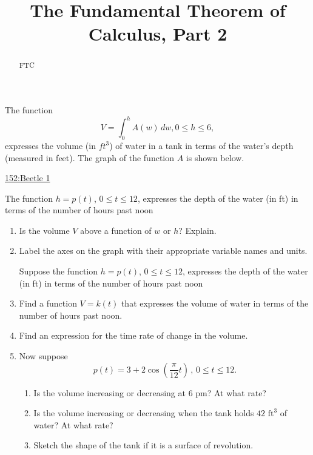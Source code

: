 \documentclass{ximera}
\title{The Fundamental Theorem of Calculus, Part 2}
\begin{document}
\begin{abstract}
FTC
\end{abstract}
\maketitle

\begin{question}\label{QWEdrf4}
The function
\[
V =\int_0^h A(w)\, dw, 0\leq h \leq 6,
\]
expresses the volume (in $ft^3$) of water in a tank in terms of the water’s depth (measured in feet). The graph of the function $A$ is shown below.


\begin{onlineOnly}
    \begin{center}
\end{center}
\end{onlineOnly}

\href{https://www.desmos.com/calculator/ae516hl7j6}{152:Beetle 1}



The function $h = p(t)$, $0 \leq t \leq 12$, expresses the depth of the water (in
ft) in terms of the number of hours past noon

\begin{enumerate}

\item Is the volume $V$ above a function of $w$ or $h$? Explain.

 \item Label the axes on the graph with their appropriate variable names and
units.



Suppose the function $h = p(t)$, $0 \leq t \leq 12$, expresses the depth of the water (in
ft) in terms of the number of hours past noon

\item Find a function $V = k(t)$ that expresses the volume of water in terms of
the number of hours past noon.

\item Find an expression for the time rate of change in the volume.

\item Now suppose
\[
p(t) = 3 + 2 \cos\left( \frac{\pi}{12}t \right) \,,\, 0 \leq t \leq 12.
\]
\begin{enumerate}
    \item Is the volume increasing or decreasing at 6 pm? At what rate?
    \item Is the volume increasing or decreasing when the tank holds $42\text{ ft}^3$ of
water? At what rate?
    \item Sketch the shape of the tank if it is a surface of revolution.

\end{enumerate}
  
\end{enumerate}
\end{question}
\end{document}
